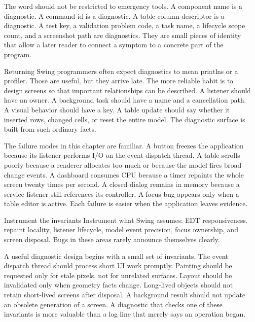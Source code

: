 The word  should not be restricted to emergency tools. A component name is a diagnostic. A command id is a diagnostic. A table column descriptor is a diagnostic. A test key, a validation problem code, a task name, a lifecycle scope count, and a screenshot path are diagnostics. They are small pieces of identity that allow a later reader to connect a symptom to a concrete part of the program.

Returning Swing programmers often expect diagnostics to mean printlns or a profiler. Those are useful, but they arrive late. The more reliable habit is to design screens so that important relationships can be described. A listener should have an owner. A background task should have a name and a cancellation path. A visual behavior should have a key. A table update should say whether it inserted rows, changed cells, or reset the entire model. The diagnostic surface is built from such ordinary facts.

The failure modes in this chapter are familiar. A button freezes the application because its listener performs I/O on the event dispatch thread. A table scrolls poorly because a renderer allocates too much or because the model fires broad change events. A dashboard consumes CPU because a timer repaints the whole screen twenty times per second. A closed dialog remains in memory because a service listener still references its controller. A focus bug appears only when a table editor is active. Each failure is easier when the application leaves evidence.

\begin{principlebox}{Instrument the invariants}
Instrument what Swing assumes: EDT responsiveness, repaint locality, listener lifecycle, model event precision, focus ownership, and screen disposal. Bugs in these areas rarely announce themselves clearly.
\end{principlebox}

A useful diagnostic design begins with a small set of invariants. The event dispatch thread should process short UI work promptly. Painting should be requested only for stale pixels, not for unrelated surfaces. Layout should be invalidated only when geometry facts change. Long-lived objects should not retain short-lived screens after disposal. A background result should not update an obsolete generation of a screen. A diagnostic that checks one of these invariants is more valuable than a log line that merely says an operation began.

